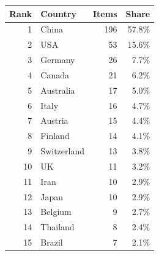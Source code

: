 \begin{tabular}{rlrr}
\toprule
Rank & Country & Items & Share \\
\midrule
1 & China & 196 & 57.8\% \\
2 & USA & 53 & 15.6\% \\
3 & Germany & 26 & 7.7\% \\
4 & Canada & 21 & 6.2\% \\
5 & Australia & 17 & 5.0\% \\
6 & Italy & 16 & 4.7\% \\
7 & Austria & 15 & 4.4\% \\
8 & Finland & 14 & 4.1\% \\
9 & Switzerland & 13 & 3.8\% \\
10 & UK & 11 & 3.2\% \\
11 & Iran & 10 & 2.9\% \\
12 & Japan & 10 & 2.9\% \\
13 & Belgium & 9 & 2.7\% \\
14 & Thailand & 8 & 2.4\% \\
15 & Brazil & 7 & 2.1\% \\
\bottomrule
\end{tabular}
